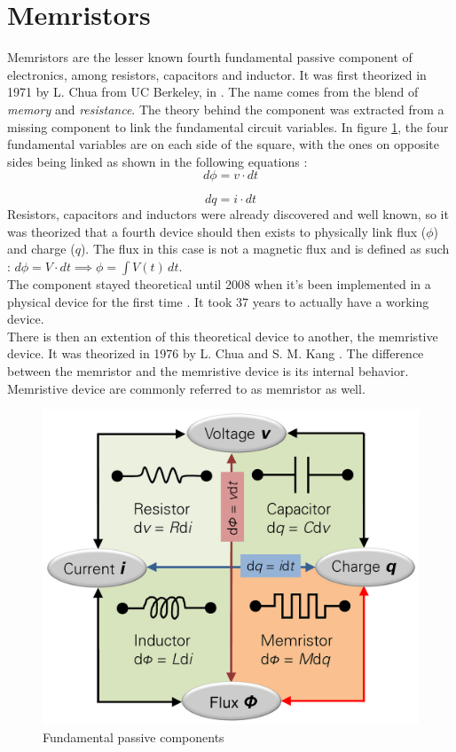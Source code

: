 \section{Memristors}
\label{sec:memristors}

Memristors are the lesser known fourth fundamental passive component of electronics, among resistors, capacitors and inductor.
It was first theorized in 1971 by L. Chua from UC Berkeley, in \cite{TheoMemristor}. The name comes from the blend of \textit{memory} and \textit{resistance}.
The theory behind the component was extracted from a missing component to link the fundamental circuit variables. In figure \ref{fig:fundComp}, the four fundamental variables are on each side of the square, with the ones on opposite sides being linked as shown in the following equations :
\begin{equation}
  d\phi = v\cdot dt
\end{equation}

\begin{equation}
  dq = i\cdot dt
\end{equation}
Resistors, capacitors and inductors were already discovered and well known, so it was theorized that a fourth device should then exists to physically link flux ($\phi$) and charge ($q$).  The flux in this case is not a magnetic flux and is defined as such : $ d\phi=V\cdot dt \implies \phi =  \int V(t) \,dt  $.\\
The component stayed theoretical until 2008 when it's been implemented in a physical device for the first time \cite{Strukov2008}. It took 37 years to actually have a working device.\\
There is then an extention of this theoretical device to another, the memristive device. It was theorized in 1976 by L. Chua and S. M. Kang \cite{memrestiveDev}. The difference between the memristor and the memristive device is its internal behavior. Memristive device are commonly referred to as memristor as well.

\begin{figure}[H]
  \centering
  \includegraphics{Figures/Memristor.png}
  \caption{Fundamental passive components}
  \label{fig:fundComp}
\end{figure}


